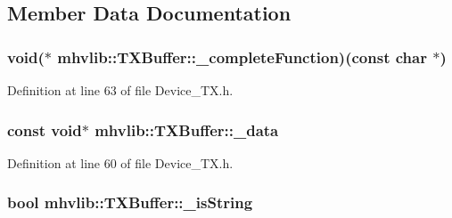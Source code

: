\subsection{Member Data Documentation}
\hypertarget{classmhvlib_1_1_t_x_buffer_a0cda837a6fa4dcf34bf2b021fcede914}{
\subsubsection[{\-\_\-complete\-Function}]{\setlength{\rightskip}{0pt plus 5cm}void($\ast$ mhvlib\-::\-T\-X\-Buffer\-::\-\_\-complete\-Function)(const char $\ast$)\hspace{0.3cm}{\ttfamily [protected]}}}\label{classmhvlib_1_1_t_x_buffer_a0cda837a6fa4dcf34bf2b021fcede914}


Definition at line 63 of file Device\-\_\-\-T\-X.\-h.

\hypertarget{classmhvlib_1_1_t_x_buffer_a3f90c3cf1012eef1f464d91ae9d5097d}{
\subsubsection[{\-\_\-data}]{\setlength{\rightskip}{0pt plus 5cm}const void$\ast$ mhvlib\-::\-T\-X\-Buffer\-::\-\_\-data\hspace{0.3cm}{\ttfamily [protected]}}}\label{classmhvlib_1_1_t_x_buffer_a3f90c3cf1012eef1f464d91ae9d5097d}


Definition at line 60 of file Device\-\_\-\-T\-X.\-h.

\hypertarget{classmhvlib_1_1_t_x_buffer_a58ebfe7a5464e3e4a2925d2b2960547d}{
\subsubsection[{\-\_\-is\-String}]{\setlength{\rightskip}{0pt plus 5cm}bool mhvlib\-::\-T\-X\-Buffer\-::\-\_\-is\-String\hspace{0.3cm}{\ttfamily [protected]}}}\label{classmhvlib_1_1_t_x_buffer_a58ebfe7a5464e3e4a2925d2b2960547d}


